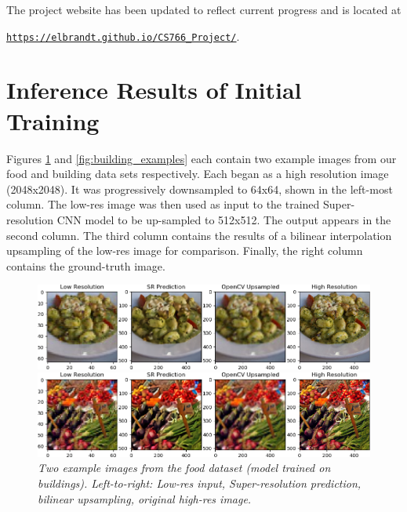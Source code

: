 \documentclass{article}
\begin{document}
\noindent The project website has been updated to reflect current progress and is located at

\texttt{\href{https://elbrandt.github.io/CS766_Project/}{https://elbrandt.github.io/CS766\_Project/}}.

\section{Inference Results of Initial Training}
Figures \ref{fig:food_examples} and \ref{fig:building_examples} each contain two example images from our food and building data sets respectively. Each began as a high resolution image (2048x2048). It was progressively downsampled to 64x64, shown in the left-most column. The low-res image was then used as input to the trained Super-resolution CNN model to be up-sampled to 512x512. The output appears in the second column. The third column contains the results of a bilinear interpolation upsampling of the low-res image for comparison. Finally, the right column contains the ground-truth image. 

\begin{figure}[h!]
\includegraphics[width=\textwidth]{midterm_results/test_img_0.png}
\par\medskip
\includegraphics[width=\textwidth]{midterm_results/test_img_1.png}
\caption{\textit{Two example images from the food dataset (model trained on buildings). Left-to-right: Low-res input, Super-resolution prediction, bilinear upsampling, original high-res image.}} \label{fig:food_examples}
\end{figure}
\end{document}
